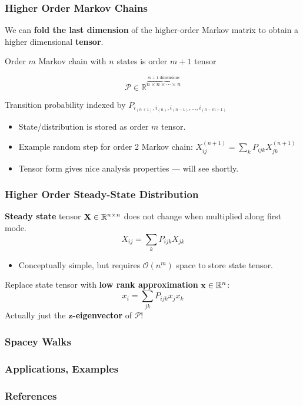 \documentclass{beamer}
\begin{document}
\begin{frame}
\frametitle{Higher Order Markov Chains}

We can \textbf{fold the last dimension} of the higher-order Markov matrix to obtain a higher dimensional \textbf{tensor}.

\begin{block}{}
Order $m$ Markov chain with $n$ states is order $m+1$ tensor

\[\mathcal{P} \in \mathbb{R}^{\overbrace{n\times n\times \cdots \times n}^{m+1\text{ dimensions}}}\]

Transition probability indexed by $P_{i_{(n+1)},i_{(n)},i_{(n-1)},\ldots,i_{(n-m+1)}}$
\end{block}

\begin{itemize}
\item State/distribution is stored as order $m$ tensor.
\item Example random step for order 2 Markov chain: $X^{(n+1)}_{ij} = \sum_k P_{ijk} X^{(n+1)}_{jk}$
\item Tensor form gives nice analysis properties --- will see shortly.
\end{itemize}

\end{frame}

\begin{frame}
\frametitle{Higher Order Steady-State Distribution}

\begin{block}{}
\textbf{Steady state} tensor ${\bf X} \in \mathbb{R}^{n \times n}$ does not change when multiplied along first mode.
\[ X_{ij} = \sum_k P_{ijk} X_{jk} \]
\end{block}
\begin{itemize}
\item Conceptually simple, but requires $\mathcal{O}\left(n^m\right)$ space to store state tensor.
\end{itemize}
\begin{block}{}
Replace state tensor with \textbf{low rank approximation} ${\bf x} \in \mathbb{R}^n$:
\[ x_i = \sum_{jk} P_{ijk} x_j x_k \]
Actually just the \textbf{$\boldsymbol{z}$-eigenvector} of $\mathcal{P}$!
\end{block}

\end{frame}

\begin{frame}
\frametitle{Spacey Walks}
\end{frame}

\begin{frame}
\frametitle{Applications, Examples}
\end{frame}

\begin{frame}
\frametitle{References}
\nocite*{}


\end{frame}
\end{document}
